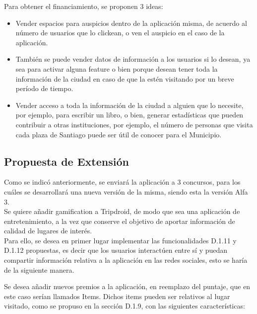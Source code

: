 \documentclass[10pt,letterpaper]{article}
\begin{document}
\begin{itemize}
Para obtener el financiamiento, se proponen 3 ideas:\\

\begin{itemize}
 \item Vender espacios para auspicios dentro de la aplicación misma, de acuerdo al número de usuarios que lo clickean, o ven el auspicio en el caso de la aplicación.

 \item También se puede vender datos de información a los usuarios si lo desean, ya sea para activar alguna feature o bien porque desean tener toda la información de la ciudad en caso de que la estén visitando por un breve período de tiempo.

 \item Vender acceso a toda la información de la ciudad a alguien que lo necesite, por ejemplo, para escribir un libro, o bien, generar estadísticas que pueden contribuir a otras instituciones, por ejemplo, el número de personas que visita cada plaza de Santiago puede ser útil de conocer para el Municipio.
\end{itemize}
\end{itemize}

\subsection{Propuesta de Extensión}

Como se indicó anteriormente, se enviará la aplicación a 3 concursos, para los cuáles se desarrollará una nueva versión de la misma, siendo esta la versión Alfa 3.\\

Se quiere añadir gamification a Tripdroid, de modo que sea una aplicación de entretenimiento, a la vez que conserve el objetivo de aportar información de calidad de lugares de interés.\\

Para ello, se desea en primer lugar implementar las funcionalidades D.1.11 y D.1.12 propuestas, es decir que los usuarios interactúen entre sí y puedan compartir información relativa a la aplicación en las redes sociales, esto se haría de la siguiente manera.

Se desea añadir nuevos premios a la aplicación, en reemplazo del puntaje, que en este caso serían llamados Items. Dichos items pueden ser relativos al lugar visitado, como se propuso en la sección D.1.9, con las siguientes características:\\
\end{document}
